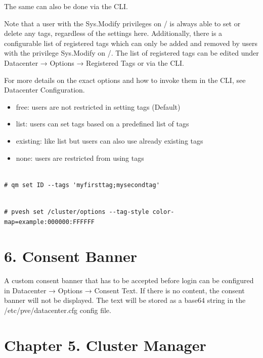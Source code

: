 The same can also be done via the CLI.

Note that a user with the Sys.Modify privileges on / is always able to set or delete any tags, regardless of the settings here. Additionally, there is a configurable list of registered tags which can only be added and removed by users with the privilege Sys.Modify on /. The list of registered tags can be edited under Datacenter → Options → Registered Tags or via the CLI.

For more details on the exact options and how to invoke them in the CLI, see Datacenter Configuration.

\begin{itemize}[leftmargin=2cm]

	\item free: users are not restricted in setting tags (Default)

	\item list: users can set tags based on a predefined list of tags

	\item existing: like list but users can also use already existing tags

	\item none: users are restricted from using tags

\end{itemize}

\begin{lstlisting}

# qm set ID --tags 'myfirsttag;mysecondtag'

\end{lstlisting}

\begin{lstlisting}

# pvesh set /cluster/options --tag-style color-map=example:000000:FFFFFF

\end{lstlisting}


\section{6. Consent Banner}

A custom consent banner that has to be accepted before login can be configured in Datacenter → Options → Consent Text. If there is no content, the consent banner will not be displayed. The text will be stored as a base64 string in the /etc/pve/datacenter.cfg config file.


\section{Chapter 5. Cluster Manager}

